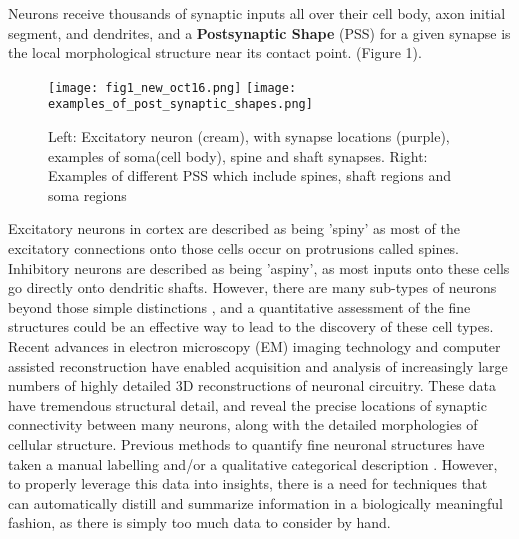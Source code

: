 \documentclass[runningheads]{llncs}
\begin{document}

Neurons receive thousands of synaptic inputs all over their cell body, axon initial segment, and dendrites,
and a \textbf{Postsynaptic Shape} (PSS) for a given synapse is the local morphological structure near its contact point. (Figure 1).
\begin{figure}[t]
    \centering
    \texttt{[image: fig1\_new\_oct16.png]}
    \texttt{[image: examples\_of\_post\_synaptic\_shapes.png]}
    \caption{Left: Excitatory neuron (cream), with synapse locations (purple), examples of soma(cell body), spine and shaft synapses. Right: Examples of different PSS which include spines, shaft regions and soma regions}
    \label{fig:introimage}
\end{figure}
Excitatory neurons in cortex are described as being 'spiny' as most of the excitatory connections onto those cells occur on protrusions called spines. Inhibitory neurons are described as being 'aspiny', as most inputs onto these cells go directly onto dendritic shafts.  However, there are many sub-types of neurons beyond those simple distinctions \cite{Tasic2018,Gouwens2019}, and a quantitative assessment of the fine structures could be an effective way to lead to the discovery of these cell types. 
Recent advances in electron microscopy (EM) imaging technology and computer assisted reconstruction have enabled acquisition and analysis of increasingly large numbers of highly detailed 3D reconstructions of neuronal circuitry. These data have tremendous structural detail, and reveal the precise locations of synaptic connectivity between many neurons, along with the detailed morphologies of cellular structure. Previous methods to quantify fine neuronal structures have taken a manual labelling and/or a qualitative categorical description \cite{Chirillo2019}. However, to properly leverage this data into insights, there is a need for techniques that can automatically distill and summarize information in a biologically meaningful fashion, as there is simply too much data to consider by hand.
\end{document}
